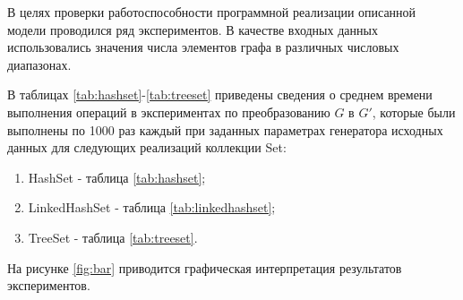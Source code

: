 

В целях проверки работоспособности программной реализации описанной модели проводился ряд экспериментов. В качестве входных данных использовались значения числа элементов графа в различных числовых диапазонах.

В таблицах \ref{tab:hashset}-\ref{tab:treeset} приведены сведения о среднем времени выполнения операций в экспериментах по преобразованию $G$ в $G'$, которые были выполнены по 1000 раз каждый при заданных параметрах генератора исходных данных для следующих реализаций коллекции Set:
\begin{enumerate}
    \item HashSet - таблица \ref{tab:hashset};
    \item LinkedHashSet - таблица \ref{tab:linkedhashset};
    \item TreeSet - таблица \ref{tab:treeset}.
\end{enumerate}

На рисунке \ref{fig:bar} приводится графическая интерпретация результатов экспериментов.


